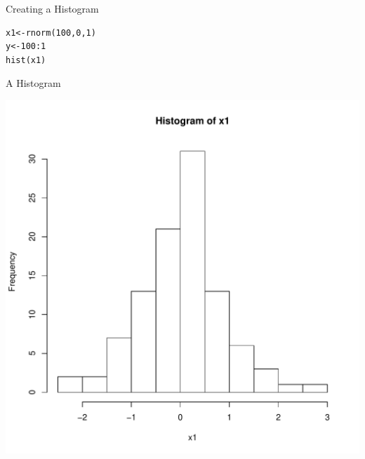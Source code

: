 \documentclass{beamer}
\begin{document}
    \begin{frame}[fragile]{Creating a Histogram}

\begin{verbatim}
x1<-rnorm(100,0,1)
y<-100:1
hist(x1)
\end{verbatim}

\end{frame}
\begin{frame}[fragile]{A Histogram}
\begin{center}
\includegraphics[width=.8\linewidth]{histogram.pdf}
\end{center}
\end{frame}
 
\end{document}
